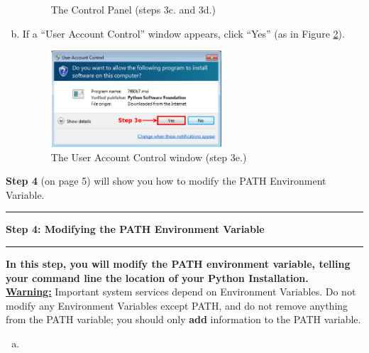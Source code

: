 \documentclass[11pt,english]{article}
\newcommand{\myhrule}{\vspace{0.3cm}\hrule\vspace{0.3cm}}
\begin{document}
\begin{enumerate}[a.]
\begin{figure}[h]
\vspace{-0.5cm}
\caption{The Control Panel (steps 3c. and 3d.)}
\label{fig:dia5}
\end{figure}
\item If a ``User Account Control'' window appears, click ``Yes'' (as in Figure
\ref{fig:dia11}).
\begin{figure}[h]
\begin{center}
\includegraphics[width=0.6\textwidth]{dia11}
\end{center}
\caption{The User Account Control window (step 3e.)}
\label{fig:dia11}
\end{figure}
\end{enumerate}
\vfill
{\bf Step 4} (on page 5) will show you how to modify the PATH Environment
Variable.
\myhrule

\newpage
{\Large {\bf Step 4: Modifying the PATH Environment Variable}}
\myhrule
{\bf In this step, you will modify the PATH environment variable, telling your
command line the location of your Python Installation.}\\

{\bf \color{red} \underline{Warning:}} Important system services depend on
Environment Variables. Do not modify any Environment Variables
except PATH, and do not remove anything from the PATH variable; you should only
{\bf add} information to the PATH variable.

\begin{enumerate}[a.]
\item
\end{enumerate}
\end{document}
